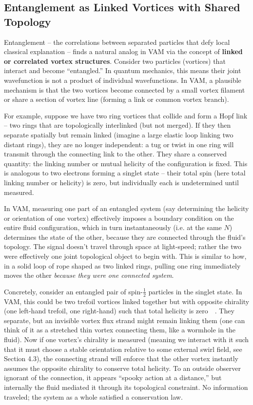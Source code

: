 \documentclass[a4paper,12pt]{article}
\begin{document}
    \subsection{Entanglement as Linked Vortices with Shared Topology}
    Entanglement – the correlations between separated particles that defy local classical explanation – finds a natural analog in VAM via the concept of \textbf{linked or correlated vortex structures}. Consider two particles (vortices) that interact and become “entangled.” In quantum mechanics, this means their joint wavefunction is not a product of individual wavefunctions. In VAM, a plausible mechanism is that the two vortices become connected by a small vortex filament or share a section of vortex line (forming a link or common vortex branch).

    For example, suppose we have two ring vortices that collide and form a Hopf link – two rings that are topologically interlinked (but not merged). If they then separate spatially but remain linked (imagine a large elastic loop linking two distant rings), they are no longer independent: a tug or twist in one ring will transmit through the connecting link to the other. They share a conserved quantity: the linking number or mutual helicity of the configuration is fixed. This is analogous to two electrons forming a singlet state – their total spin (here total linking number or helicity) is zero, but individually each is undetermined until measured.

    In VAM, measuring one part of an entangled system (say determining the helicity or orientation of one vortex) effectively imposes a boundary condition on the entire fluid configuration, which in turn instantaneously (i.e. at the same $N$) determines the state of the other, because they are connected through the fluid’s topology. The signal doesn’t travel through space at light-speed; rather the two were effectively one joint topological object to begin with. This is similar to how, in a solid loop of rope shaped as two linked rings, pulling one ring immediately moves the other \emph{because they were one connected system}.

    Concretely, consider an entangled pair of spin-$\frac{1}{2}$ particles in the singlet state. In VAM, this could be two trefoil vortices linked together but with opposite chirality (one left-hand trefoil, one right-hand) such that total helicity is zero~\cite{reference_102}~\cite{reference_103}. They separate, but an invisible vortex flux strand might remain linking them (one can think of it as a stretched thin vortex connecting them, like a wormhole in the fluid). Now if one vortex’s chirality is measured (meaning we interact with it such that it must choose a stable orientation relative to some external swirl field, see Section 4.3), the connecting strand will enforce that the other vortex instantly assumes the opposite chirality to conserve total helicity. To an outside observer ignorant of the connection, it appears “spooky action at a distance,” but internally the fluid mediated it through its topological constraint. No information traveled; the system as a whole satisfied a conservation law.
\end{document}
